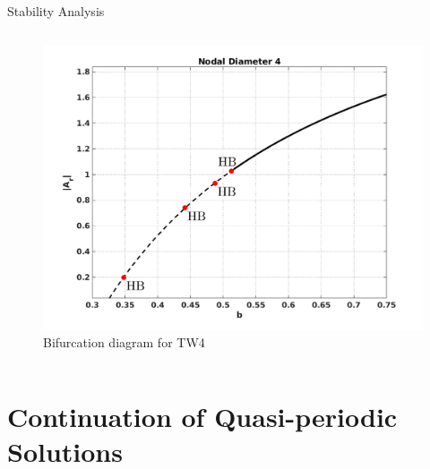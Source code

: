 \documentclass[dvipsnames, aspectratio = 169]{beamer}
\begin{document}
\begin{frame}{Stability Analysis}
	\begin{columns}
		\begin{column}{0.5\textwidth}
			\begin{figure}[h]
				\centering
				\includegraphics[width = 1\textwidth]{TW4_Bifurcation.png}
				\caption{Bifurcation diagram for TW4}
				\label{fig:log_TW_amp_bas3}
			\end{figure}
		\end{column}
	\end{columns}
\end{frame}

\section{Continuation of Quasi-periodic Solutions}
\end{document}
